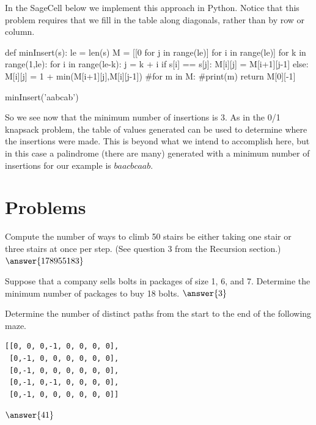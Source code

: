 \documentclass{ximera}
\begin{document}
In the SageCell below we implement this approach in Python. Notice that this problem requires that we fill in the table along diagonals, rather than by row or column.

\begin{sageCell}
def minInsert(s):
        le = len(s)
        M = [[0 for j in range(le)] for i in range(le)]
        for k in range(1,le):
                for i in range(le-k):
                        j = k + i
                        if s[i] == s[j]:
                                M[i][j] = M[i+1][j-1]
                        else:
                                M[i][j] = 1 + min(M[i+1][j],M[i][j-1])
        #for m in M:
                #print(m)
        return M[0][-1]

minInsert('aabcab')
\end{sageCell}

So we see now that the minimum number of insertions is 3. As in the 0/1 knapsack problem, the table of values generated can be used to determine where the insertions were made. This is beyond what we intend to accomplish here, but in this case a palindrome (there are many) generated with a minimum number of insertions for our example is $baacbcaab$.

\section{Problems}

\begin{question}
Compute the number of ways to climb 50 stairs be either taking one stair or three stairs at once per step. (See question 3 from the Recursion section.) $\answer{178955183}$
\end{question}

\begin{question}
Suppose that a company sells bolts in packages of size 1, 6, and 7. Determine the minimum number of packages to buy 18 bolts. $\answer{3}$
\end{question}

\begin{question}
Determine the number of distinct paths from the start to the end of the following maze.
\begin{verbatim}
[[0, 0, 0,-1, 0, 0, 0, 0],
 [0,-1, 0, 0, 0, 0, 0, 0],
 [0,-1, 0, 0, 0, 0, 0, 0],
 [0,-1, 0,-1, 0, 0, 0, 0],
 [0,-1, 0, 0, 0, 0, 0, 0]]
\end{verbatim}
	$\answer{41}$
\end{question}
\end{document}

